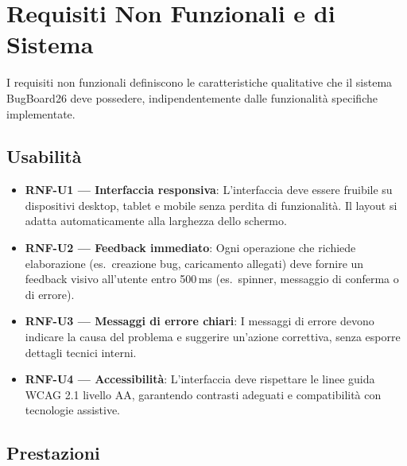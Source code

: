 
\section{Requisiti Non Funzionali e di Sistema}

I requisiti non funzionali definiscono le caratteristiche qualitative che il sistema BugBoard26 deve possedere, indipendentemente dalle funzionalità specifiche implementate.

\subsection{Usabilità}

\begin{itemize}
    \item \textbf{RNF-U1 --- Interfaccia responsiva}: L'interfaccia deve essere fruibile su dispositivi desktop, tablet e mobile senza perdita di funzionalità. Il layout si adatta automaticamente alla larghezza dello schermo.
    \item \textbf{RNF-U2 --- Feedback immediato}: Ogni operazione che richiede elaborazione (es.\ creazione bug, caricamento allegati) deve fornire un feedback visivo all'utente entro 500\,ms (es.\ spinner, messaggio di conferma o di errore).
    \item \textbf{RNF-U3 --- Messaggi di errore chiari}: I messaggi di errore devono indicare la causa del problema e suggerire un'azione correttiva, senza esporre dettagli tecnici interni.
    \item \textbf{RNF-U4 --- Accessibilità}: L'interfaccia deve rispettare le linee guida WCAG 2.1 livello AA, garantendo contrasti adeguati e compatibilità con tecnologie assistive.
\end{itemize}

\subsection{Prestazioni}


